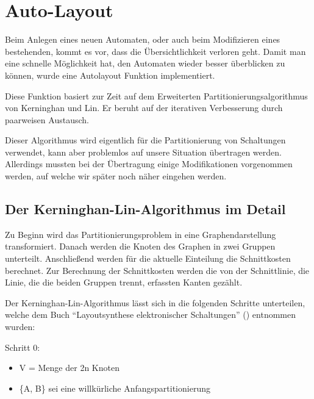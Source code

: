 

\chapter{Auto-Layout}\label{AutoLayout}

Beim Anlegen eines neuen Automaten, oder auch beim Modifizieren eines
bestehenden, kommt es vor, dass die Übersichtlichkeit verloren geht. Damit man
eine schnelle Möglichkeit hat, den Automaten wieder besser überblicken zu
können, wurde eine Autolayout Funktion implementiert.\vspace{10pt}

Diese Funktion basiert zur Zeit auf dem Erweiterten Partitionierungsalgorithmus
von Kerninghan und Lin. Er beruht auf der iterativen Verbesserung durch
paarweisen Austausch.\vspace{10pt}

Dieser Algorithmus wird eigentlich für die Partitionierung von Schaltungen
verwendet, kann aber problemlos auf unsere Situation übertragen werden.
Allerdings mussten bei der Übertragung einige Modifikationen
vorgenommen werden, auf welche wir später noch näher eingehen
werden.\vspace{10pt}

\section{Der Kerninghan-Lin-Algorithmus im Detail}\label{KerninghanLin}

Zu Beginn wird das Partitionierungsproblem in eine Graphendarstellung
transformiert. Danach werden die Knoten des Graphen in zwei Gruppen unterteilt.
Anschließend werden für die aktuelle Einteilung die Schnittkosten berechnet.
Zur Berechnung der Schnittkosten werden die von der Schnittlinie, die Linie, die
die beiden Gruppen trennt, erfassten Kanten gezählt.\vspace{10pt}

Der Kerninghan-Lin-Algorithmus lässt sich in die folgenden Schritte
unterteilen, welche dem Buch "`Layoutsynthese elektronischer
Schaltungen"' (\cite{Layout}) entnommen wurden:\vspace{10pt}

Schritt 0:
\begin{itemize}
  \item V = Menge der 2n Knoten 
  \item \{A, B\} sei eine willkürliche Anfangspartitionierung
\end{itemize}

